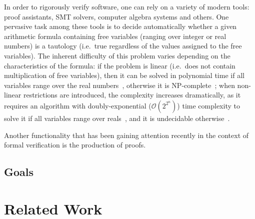 \documentclass[a4paper, 12pt]{article}
\begin{document}
In order to rigorously verify software, one can rely on a variety of modern tools: proof assistants,
SMT solvers, computer algebra systems and others. One pervasive task among these tools is to decide
automatically whether a given arithmetic formula containing free variables (ranging over integer or
real numbers) is a tautology (i.e.\ true regardless of the values assigned to the free variables).
The inherent difficulty of this problem varies depending on the characteristics of the formula:
if the problem is linear (i.e.\ does not contain multiplication of free variables), then
it can be solved in polynomial time if all variables range over the real numbers~\cite{Kha79}, otherwise it
is NP-complete~\cite{Kar72}; when non-linear restrictions are introduced, the complexity increases
dramatically, as it requires an algorithm with doubly-exponential ($\mathcal{O}(2^{2^{n}})$) time complexity
to solve it if all variables range over reals~\cite{computerAlgebraBook},
and it is undecidable otherwise~\cite{integerUndec}.

Another functionality that has been gaining attention recently in the context of formal verification is
the production of proofs.





\subsection{Goals}



\section{Related Work}


\end{document}
